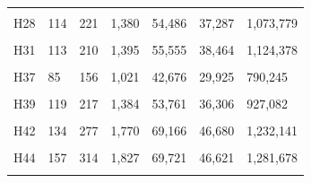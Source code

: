 \documentclass[
  a4paper,
  titlepage]{article}
\begin{document}
\begin{longtable}[t]{lllllll}
\cellcolor{gray!6}{H26} & \cellcolor{gray!6}{99} & \cellcolor{gray!6}{188} & \cellcolor{gray!6}{1,296} & \cellcolor{gray!6}{51,896} & \cellcolor{gray!6}{35,926} & \cellcolor{gray!6}{988,649}\\
 
H28 & 114 & 221 & 1,380 & 54,486 & 37,287 & 1,073,779\\
 
\cellcolor{gray!6}{H30} & \cellcolor{gray!6}{133} & \cellcolor{gray!6}{249} & \cellcolor{gray!6}{1,592} & \cellcolor{gray!6}{62,536} & \cellcolor{gray!6}{42,108} & \cellcolor{gray!6}{1,172,812}\\
 
H31 & 113 & 210 & 1,395 & 55,555 & 38,464 & 1,124,378\\
 
\cellcolor{gray!6}{H36} & \cellcolor{gray!6}{138} & \cellcolor{gray!6}{262} & \cellcolor{gray!6}{1,681} & \cellcolor{gray!6}{65,771} & \cellcolor{gray!6}{45,114} & \cellcolor{gray!6}{1,151,981}\\
 
H37 & 85 & 156 & 1,021 & 42,676 & 29,925 & 790,245\\
 
\cellcolor{gray!6}{H38} & \cellcolor{gray!6}{126} & \cellcolor{gray!6}{221} & \cellcolor{gray!6}{1,485} & \cellcolor{gray!6}{58,874} & \cellcolor{gray!6}{40,619} & \cellcolor{gray!6}{1,190,341}\\
 
H39 & 119 & 217 & 1,384 & 53,761 & 36,306 & 927,082\\
 
\cellcolor{gray!6}{H41} & \cellcolor{gray!6}{150} & \cellcolor{gray!6}{247} & \cellcolor{gray!6}{1,673} & \cellcolor{gray!6}{64,750} & \cellcolor{gray!6}{44,378} & \cellcolor{gray!6}{1,280,024}\\
 
H42 & 134 & 277 & 1,770 & 69,166 & 46,680 & 1,232,141\\
 
\cellcolor{gray!6}{H43} & \cellcolor{gray!6}{121} & \cellcolor{gray!6}{229} & \cellcolor{gray!6}{1,505} & \cellcolor{gray!6}{58,169} & \cellcolor{gray!6}{39,709} & \cellcolor{gray!6}{949,572}\\
 
H44 & 157 & 314 & 1,827 & 69,721 & 46,621 & 1,281,678\\
 
\cellcolor{gray!6}{H45} & \cellcolor{gray!6}{144} & \cellcolor{gray!6}{224} & \cellcolor{gray!6}{1,589} & \cellcolor{gray!6}{61,671} & \cellcolor{gray!6}{41,667} & \cellcolor{gray!6}{1,110,147}\\
 

\end{longtable}
\end{document}
